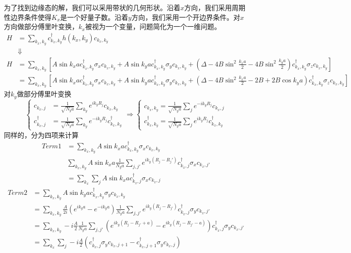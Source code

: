 \documentclass{article}
\numberwithin{equation}{subsection}
\begin{document}
为了找到边缘态的解，我们可以采用带状的几何形状。沿着$x$方向，我们采用周期性边界条件使得$K_x$是一个好量子数。沿着$y$方向，我们采用一个开边界条件。对$x$方向做部分傅里叶变换，$k_x$被视为一个变量，问题简化为一个一维问题。
\begin{equation}
    \begin{split}
        H&=\sum_{k_x,k_y}c_{k_x,k_y}^\dagger h(k_x,k_y)c_{k_x,k_y}\\
        &\Downarrow\\
        H&=\sum_{k_x,k_y}\left[A\sin k_xac_{k_x,k_y}^\dagger\sigma_xc_{k_x,k_y}+A\sin k_yac_{k_x,k_y}^\dagger\sigma_yc_{k_x,k_y}+(\Delta-4B\sin^2\frac{k_xa}{2}-4B\sin^2\frac{k_ya}{2})c_{k_x,k_y}^\dagger\sigma_zc_{k_x,k_y}\right]\\
        &=\sum_{k_x,k_y}\left[A\sin k_xac_{k_x,k_y}^\dagger\sigma_xc_{k_x,k_y}+A\sin k_yac_{k_x,k_y}^\dagger\sigma_yc_{k_x,k_y}+(\Delta-4B\sin^2\frac{k_xa}{2}-2B+2B\cos k_ya)c_{k_x,k_y}^\dagger\sigma_zc_{k_x,k_y}\right]
    \end{split}
\end{equation}
对$k_y$做部分傅里叶变换
\begin{equation}
    \begin{cases}
        c_{k_x,j}&=\frac{1}{\sqrt{N_ya}}\sum_{k_y}e^{ik_yR_j}c_{k_x,k_y}\\
        c_{k_x,j}^\dagger&=\frac{1}{\sqrt{N_ya}}\sum_{k_y}e^{-ik_yR_j}c_{k_x,k_y}^\dagger
    \end{cases}\Longrightarrow\begin{cases}
        c_{k_x,k_y}=\frac{1}{\sqrt{N_ya}}\sum_{j}e^{-ik_yR_j}c_{k_x,j}\\
        c_{k_x,k_y}^\dagger=\frac{1}{\sqrt{N_ya}}\sum_{j}e^{ik_yR_j}c_{k_x,k_y}^\dagger
    \end{cases}
\end{equation}
同样的，分为四项来计算
\begin{equation}
    \begin{split}
        Term1&=\sum_{k_x,k_y}A\sin k_xac_{k_x,k_y}^\dagger\sigma_xc_{k_x,k_y}\\
        &\sum_{k_x,k_y}A\sin k_xa\frac{1}{N_ya}\sum_{j,j'}e^{ik_y(R_j-R_j')}c_{k_x,j}^\dagger\sigma_xc_{k_x,j'}\\
        &=\sum_{k_x}\sum_{j}A\sin k_xac_{k_x,j}^\dagger\sigma_xc_{k_x,j}
    \end{split}
\end{equation}
\begin{equation}
    \begin{split}
        Term2&=\sum_{k_x,k_y}A\sin k_yac_{k_x,k_y}^\dagger\sigma_yc_{k_x,k_y}\\
        &=\sum_{k_x,k_y}\frac{A}{2i}(e^{ik_ya}-e^{-ik_ya})\frac{1}{N_ya}\sum_{j,j'}e^{ik_y(R_j-R_{j'})}c_{k_x,j}^\dagger\sigma_yc_{k_x,j'}\\
        &=\sum_{k_x,k_y}-i\frac{A}{2}\frac{1}{N_ya}\sum_{j,j'}(e^{ik_y(R_j-R_{j'}+a)}-e^{ik_y(R_j-R_{j'}-a)})c_{k_x,j}^\dagger\sigma_yc_{k_x,j'}\\
        &=\sum_{k_x}\sum_{j}-i\frac{A}{2}(c_{k_x,j}^\dagger\sigma_yc_{k_x,j+1}-c_{k_x,j+1}^\dagger\sigma_yc_{k_x,j})
    \end{split}
\end{equation}
\end{document}
